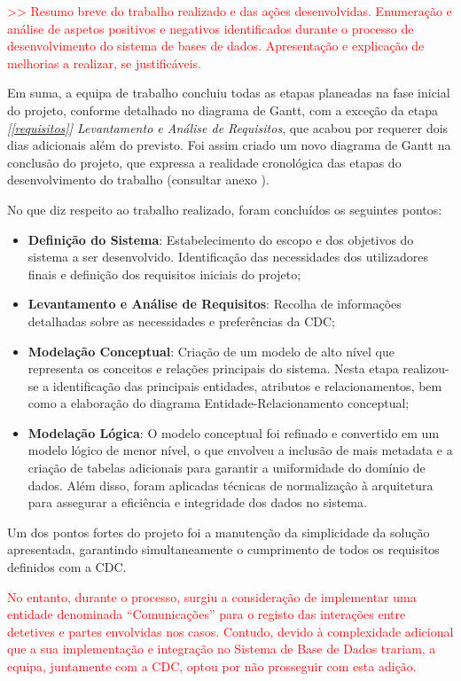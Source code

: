 \documentclass[a4paper,12pt]{scrreprt}
\begin{document}
    \textcolor{red}{>> Resumo breve do trabalho realizado e das ações desenvolvidas. Enumeração e análise de aspetos positivos e negativos identificados durante o processo de desenvolvimento do sistema de bases de dados. Apresentação e explicação de melhorias a realizar, se justificáveis.}

    Em suma, a equipa de trabalho concluiu todas as etapas planeadas na fase inicial do projeto, conforme detalhado no diagrama de Gantt, com a exceção da etapa \textit{[\ref{requisitos}] Levantamento e Análise de Requisitos}, que acabou por requerer dois dias adicionais além do previsto. Foi assim criado um novo diagrama de Gantt na conclusão do projeto, que expressa a realidade cronológica das etapas do desenvolvimento do trabalho (consultar anexo \textit{}).

    No que diz respeito ao trabalho realizado, foram concluídos os seguintes pontos:
    \begin{itemize}
        \item \textbf{Definição do Sistema}: Estabelecimento do escopo e dos objetivos do sistema a ser desenvolvido. Identificação das necessidades dos utilizadores finais e definição dos requisitos iniciais do projeto;
        \item \textbf{Levantamento e Análise de Requisitos}: Recolha de informações detalhadas sobre as necessidades e preferências da CDC;
        \item \textbf{Modelação Conceptual}: Criação de um modelo de alto nível que representa os conceitos e relações principais do sistema. Nesta etapa realizou-se a identificação das principais entidades, atributos e relacionamentos, bem como a elaboração do diagrama
        Entidade-Relacionamento conceptual;
        \item \textbf{Modelação Lógica}: O modelo conceptual foi refinado e convertido em um modelo lógico de menor nível, o que envolveu a inclusão de mais metadata e a criação de tabelas adicionais para garantir a uniformidade do domínio de dados. Além disso, foram aplicadas técnicas de normalização à arquitetura para assegurar a eficiência e integridade dos dados no sistema.
    \end{itemize}

    Um dos pontos fortes do projeto foi a manutenção da simplicidade da solução apresentada, garantindo simultaneamente o cumprimento de todos os requisitos definidos com a CDC.

    \textcolor{red}{No entanto, durante o processo, surgiu a consideração de implementar uma entidade denominada “Comunicações” para o registo das interações entre detetives e partes envolvidas nos casos. Contudo, devido à complexidade adicional que a sua implementação e integração no Sistema de Base de Dados trariam, a equipa, juntamente com a CDC, optou por não prosseguir com esta adição.}
\end{document}

